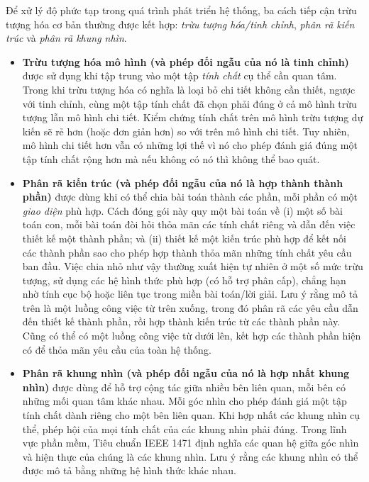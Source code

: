 Để xử lý độ phức tạp trong quá trình phát triển hệ thống, ba cách tiếp cận trừu tượng hóa cơ bản thường được kết hợp: \emph{trừu tượng hóa/tinh chỉnh}, \emph{phân rã kiến trúc} và \emph{phân rã khung nhìn}.
\begin{itemize}
\item \textbf{Trừu tượng hóa mô hình (và phép đối ngẫu của nó là tinh chỉnh)} được sử dụng khi tập trung vào một tập \emph{tính chất} cụ thể cần quan tâm. Trong khi trừu tượng hóa có nghĩa là loại bỏ chi tiết không cần thiết, ngược với tinh chỉnh, cùng một tập tính chất đã chọn phải đúng ở cả mô hình trừu tượng lẫn mô hình chi tiết. Kiểm chứng tính chất trên mô hình trừu tượng dự kiến sẽ rẻ hơn (hoặc đơn giản hơn) so với trên mô hình chi tiết. Tuy nhiên, mô hình chi tiết hơn vẫn có những lợi thế vì nó cho phép đánh giá đúng một tập tính chất rộng hơn mà nếu không có nó thì không thể bao quát.
\item \textbf{Phân rã kiến trúc (và phép đối ngẫu của nó là hợp thành thành phần)} được dùng khi có thể chia bài toán thành các phần, mỗi phần có một \emph{giao diện} phù hợp. Cách đóng gói này quy một bài toán về (i) một số bài toán con, mỗi bài toán đòi hỏi thỏa mãn các tính chất riêng và dẫn đến việc thiết kế một thành phần; và (ii) thiết kế một kiến trúc phù hợp để kết nối các thành phần sao cho phép hợp thành thỏa mãn những tính chất yêu cầu ban đầu. Việc chia nhỏ như vậy thường xuất hiện tự nhiên ở một số mức trừu tượng, sử dụng các hệ hình thức phù hợp (có hỗ trợ phân cấp), chẳng hạn nhờ tính cục bộ hoặc liên tục trong miền bài toán/lời giải. Lưu ý rằng mô tả trên là một luồng công việc từ trên xuống, trong đó phân rã các yêu cầu dẫn đến thiết kế thành phần, rồi hợp thành kiến trúc từ các thành phần này. Cũng có thể có một luồng công việc từ dưới lên, kết hợp các thành phần hiện có để thỏa mãn yêu cầu của toàn hệ thống.
\item \textbf{Phân rã khung nhìn (và phép đối ngẫu của nó là hợp nhất khung nhìn)} được dùng để hỗ trợ cộng tác giữa nhiều bên liên quan, mỗi bên có những mối quan tâm khác nhau. Mỗi góc nhìn cho phép đánh giá một tập tính chất dành riêng cho một bên liên quan. Khi hợp nhất các khung nhìn cụ thể, phép hội của mọi tính chất của các khung nhìn phải đúng. Trong lĩnh vực phần mềm, Tiêu chuẩn IEEE 1471 định nghĩa các quan hệ giữa góc nhìn và hiện thực của chúng là các khung nhìn. Lưu ý rằng các khung nhìn có thể được mô tả bằng những hệ hình thức khác nhau.
\end{itemize}

